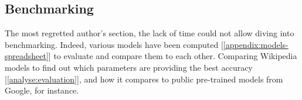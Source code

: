 \subsection{Benchmarking}
The most regretted author's section, the lack of time could not allow diving into benchmarking. Indeed, various models have been computed [\ref{appendix:models-spreadsheet}] to evaluate and compare them to each other. Comparing Wikipedia models to find out which parameters are providing the best accuracy [\ref{analyse:evaluation}], and how it compares to public pre-trained models from Google, for instance.
